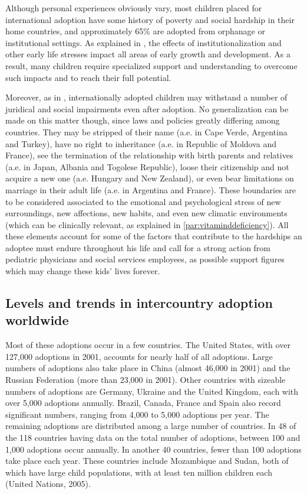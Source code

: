 Although personal experiences obviously vary, most children placed for international adoption have some history of poverty and social hardship in their home countries, and approximately 65\% are adopted from orphanage or institutional settings. As explained in \cite{nelson}, the effects of institutionalization and other early life stresses impact all areas of early growth and development. As a result, many children require specialized support and understanding to overcome such impacts and to reach their full potential. 

Moreover, as in \cite{unreport}, internationally adopted children may withstand a number of juridical and social impairments even after adoption. No generalization can be made on this matter though, since laws and policies greatly differing among countries. They may be stripped of their name (a.e. in Cape Verde, Argentina and Turkey), have no right to inheritance (a.e. in Republic of Moldova and France), see the termination of the relationship with birth parents and relatives (a.e. in Japan, Albania and Togolese Republic), loose their citizenship and not acquire a new one (a.e. Hungary and New Zealand), or even bear limitations on marriage in their adult life (a.e. in Argentina and France). These boundaries are to be considered associated to the emotional and psychological stress of new surroundings, new affections, new habits, and even new climatic environments (which can be clinically relevant, as explained in \ref{par:vitaminddeficiency}). \linebreak All these elements account for some of the factors that contribute to the hardships an adoptee must endure throughout his life and call for a strong action from pediatric physicians and social services employees, as possible support figures which may change these kids' lives forever.


\subsection{Levels and trends in intercountry adoption worldwide}\label{sub:levelsintercountry}
Most of these adoptions occur in a few countries. The United States, with over 127,000 adoptions in 2001, accounts for nearly half of all adoptions. Large numbers of adoptions also take place in China (almost 46,000 in 2001) and the Russian Federation (more than 23,000 in 2001). Other countries with sizeable numbers of adoptions are Germany, Ukraine and the United Kingdom, each with over 5,000 adoptions annually. Brazil, Canada, France and Spain also record significant numbers, ranging from 4,000 to 5,000 adoptions per year\cite{unreport}.
The remaining adoptions are distributed among a large number of countries. In 48 of the 118 countries having data on the total number of adoptions, between 100 and 1,000 adoptions occur annually. In another 40 countries, fewer than 100 adoptions take place each year. These countries include Mozambique and Sudan, both of which have large child populations, with at least ten million children each (United Nations, 2005)\cite{unreport}.

